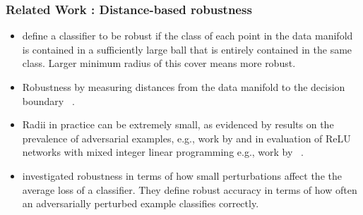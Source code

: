 

 \begin{frame}
   \frametitle{Related Work : Distance-based robustness}

   \begin{itemize}
\item  \citet{khoury2018} define a classifier to be robust if the class of
 each point in the data manifold is contained in a sufficiently large
 ball that is entirely contained in the same class. Larger minimum
 radius of this cover means more robust. 
\item  Robustness by measuring distances from the data manifold to the decision boundary
 ~\citep{Wang2020Improving, xu2023exploring, he2018decision}.

 \item Radii in practice can be extremely small, as evidenced by
 results on the prevalence of adversarial examples, e.g., work by
 \citet{inevitable2018} and in evaluation of ReLU networks with mixed
 integer linear programming e.g., work by ~\citet{tjeng2017evaluating}.

\item \citet{tsipras2018robustness} investigated robustness in terms of how
  small perturbations affect the the average loss of a
  classifier. They define robust accuracy in terms of how often an
  adversarially perturbed example classifies correctly.


\end{itemize}
\end{frame}
